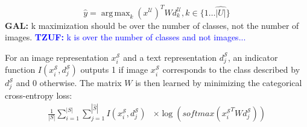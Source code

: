 \documentclass[11pt,a4paper]{article}
\DeclareMathOperator*{\argmax}{arg\,max}
\newcommand\gal[1]{\textcolor{bright}{\textbf{GAL:} #1 }}
\newcommand\yuval[1]{\textcolor{darkpink}{\textbf{YUVAL:} #1 }}
\newcommand\tzuf[1]{\textcolor{blue}{\textbf{TZUF:} #1 }}
\begin{document}

\begin{equation}
    \label{equation:attention}
    {\hat{y}}=\argmax_{k} \left( x^{\mathcal{U}} \right) ^{T}Wd^{\mathcal{U}}_{k}, k \in \{1 \dots \hat{|U|}\}
\end{equation}
\gal{k maximization should be over the number of classes, not the number of images.}\tzuf{k is over the number of classes and not images...}

For an image representation $x^{\mathcal{S}}_i$ and a text representation $d^{\mathcal{S}}_j$, an indicator function $I(x^{\mathcal{S}}_i,d^{\mathcal{S}}_j)$  outputs 1 if image $x^{\mathcal{S}}_i$ corresponds to the class described by $d^{\mathcal{S}}_j$ and 0 otherwise. 
The matrix $W$ is then learned by minimizing the categorical cross-entropy loss: 
\begin{equation}
\begin{split}
    \frac{1}{|S|}\sum_{i=1}^{|S|}\sum_{j=1}^{|\hat{S}|}I(x^{\mathcal{S}}_i,d^{\mathcal{S}}_j) 
    &\times\log(\textit{softmax}({x^{\mathcal{S}}_i}^TWd^{\mathcal{S}}_j))
\end{split}
\end{equation}
\end{document}
